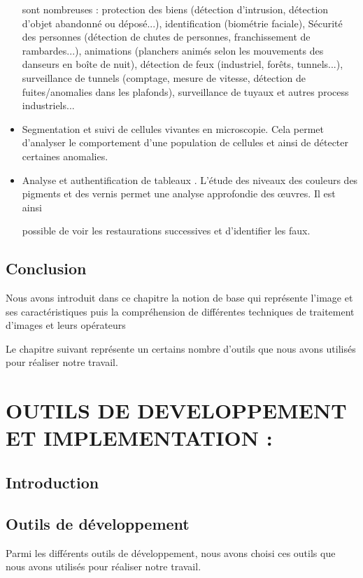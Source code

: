 \documentclass[11pt]{report}
\begin{document}
\begin{itemize}
sont nombreuses : protection des biens (détection d'intrusion, détection d'objet
abandonné ou déposé...), identification (biométrie faciale), Sécurité des personnes
(détection de chutes de personnes, franchissement de rambardes...), animations
(planchers animés selon les mouvements des danseurs en boîte de nuit), détection
de feux (industriel, forêts, tunnels...), surveillance de tunnels (comptage, mesure de
vitesse, détection de fuites/anomalies dans les plafonds), surveillance de tuyaux et
autres process industriels...
\item
Segmentation et suivi de cellules vivantes en microscopie. Cela permet
d'analyser le comportement d'une population de cellules et ainsi de détecter
certaines anomalies.
\item
Analyse et authentification de tableaux . L'étude des niveaux des couleurs des
pigments et des vernis permet une analyse approfondie des œuvres. Il est ainsi

possible de voir les restaurations successives et d'identifier les faux.

\end{itemize}

\section{Conclusion}
Nous avons introduit dans ce chapitre la notion de base qui représente l’image et ses
caractéristiques puis la compréhension de différentes techniques de traitement d’images et
leurs opérateurs

Le chapitre suivant représente un certains nombre d'outils que nous avons utilisés pour réaliser notre travail.

\chapter{OUTILS DE DEVELOPPEMENT ET
	IMPLEMENTATION :}

\section{Introduction}
\section{Outils de développement}
Parmi les différents outils de développement, nous avons choisi ces outils que nous
avons utilisés pour réaliser notre travail.
\end{document}

